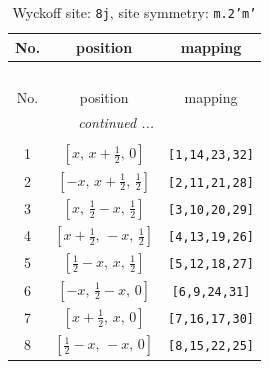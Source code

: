 \documentclass[fleqn,8pt]{jsarticle}
\begin{document}
\begin{longtable}{ccc}
\caption{Wyckoff site: {\tt 8j}, site symmetry: {\tt m.2'm'}}
 \\
 \hline \hline
No. & position & mapping \\ \hline \endfirsthead

\multicolumn{2}{l}{\tablename\ \thetable{}} \\
 \hline \hline
No. & position & mapping \\ \hline \endhead

 \hline \hline
\multicolumn{2}{r}{\footnotesize\it continued ...} \\ \endfoot

 \hline \hline
\multicolumn{2}{r}{} \\ \endlastfoot

1 & $\left[ x,\, x + \frac{1}{2},\, 0 \right]$ & {\tt [1,14,23,32]} \\ \hline
2 & $\left[ - x,\, x + \frac{1}{2},\, \frac{1}{2} \right]$ & {\tt [2,11,21,28]} \\ \hline
3 & $\left[ x,\, \frac{1}{2} - x,\, \frac{1}{2} \right]$ & {\tt [3,10,20,29]} \\ \hline
4 & $\left[ x + \frac{1}{2},\, - x,\, \frac{1}{2} \right]$ & {\tt [4,13,19,26]} \\ \hline
5 & $\left[ \frac{1}{2} - x,\, x,\, \frac{1}{2} \right]$ & {\tt [5,12,18,27]} \\ \hline
6 & $\left[ - x,\, \frac{1}{2} - x,\, 0 \right]$ & {\tt [6,9,24,31]} \\ \hline
7 & $\left[ x + \frac{1}{2},\, x,\, 0 \right]$ & {\tt [7,16,17,30]} \\ \hline
8 & $\left[ \frac{1}{2} - x,\, - x,\, 0 \right]$ & {\tt [8,15,22,25]} \\
\end{longtable}
\renewcommand{\arraystretch}{1.2}
\end{document}
